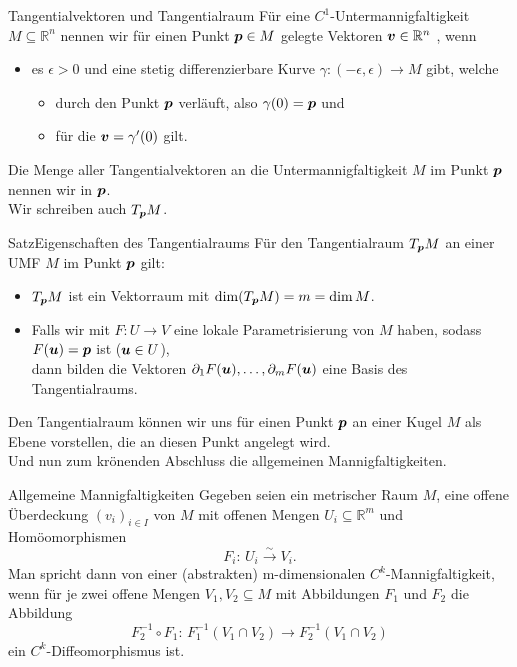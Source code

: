 \begin{Def}
{Tangentialvektoren und Tangentialraum}
Für eine $C^1$-Untermannigfaltigkeit $M\subseteq\mathbb{R}^n$ nennen wir für einen Punkt ${{\text{\boldmath${p}$}}}\in M$ gelegte Vektoren ${{\text{\boldmath${v}$}}}\in\mathbb{R}^n$ , wenn
\begin{itemize}
    \item es $\epsilon>0$ und eine stetig differenzierbare Kurve $\gamma:(-\epsilon,\epsilon)\to M$ gibt, welche
    \begin{itemize}
        \item durch den Punkt ${{\text{\boldmath${p}$}}}$ verläuft, also $\gamma(0)={{\text{\boldmath${p}$}}}$ und
        \item für die ${{\text{\boldmath${v}$}}}=\gamma'(0)$ gilt.
    \end{itemize}
\end{itemize}
Die Menge aller Tangentialvektoren an die Untermannigfaltigkeit $M$ im Punkt ${{\text{\boldmath${p}$}}}$ nennen wir  in ${{\text{\boldmath${p}$}}}$.\\
Wir schreiben auch $T_{{\text{\boldmath${p}$}}} M$.
\end{Def}
\begin{Satz}
{Satz}{Eigenschaften des Tangentialraums}
Für den Tangentialraum $T_{{\text{\boldmath${p}$}}} M$ an einer UMF $M$ im Punkt ${{\text{\boldmath${p}$}}}$ gilt:
\begin{itemize}
    \item $T_{{\text{\boldmath${p}$}}} M$ ist ein Vektorraum mit $\dim (T_{{\text{\boldmath${p}$}}} M)=m=\dim M$.
    \item Falls wir mit $F:U\to V$ eine lokale Parametrisierung von $M$ haben, sodass $F({{\text{\boldmath${u}$}}})={{\text{\boldmath${p}$}}}$ ist (${{\text{\boldmath${u}$}}}\in U$),\\
    dann bilden die Vektoren $\partial_1F({{\text{\boldmath${u}$}}}),\ldots,\partial_mF({{\text{\boldmath${u}$}}})$ eine Basis des Tangentialraums.
\end{itemize}
\end{Satz}
Den Tangentialraum können wir uns für einen Punkt ${{\text{\boldmath${p}$}}}$ an einer Kugel $M$ als Ebene vorstellen, die an diesen Punkt angelegt wird.\\

Und nun zum krönenden Abschluss die allgemeinen Mannigfaltigkeiten.
\begin{Def}
    {Allgemeine Mannigfaltigkeiten}
    Gegeben seien ein metrischer Raum $M$, eine offene Überdeckung $(v_i)_{i\in I}$ von $M$ mit offenen Mengen $U_i \subseteq \mathbb{R}^m$ und Homöomorphismen 
    \begin{equation*}
        F_i:\, U_i\overset{\sim}{\rightarrow} V_i.
    \end{equation*}
    Man spricht dann von einer (abstrakten) m-dimensionalen $C^k$-Mannigfaltigkeit, wenn für je zwei offene Mengen $V_1,V_2\subseteq M$ mit Abbildungen $F_1$ und $F_2$ die Abbildung
    \begin{equation*}
        F_2^{-1}\circ F_1:\, F_1^{-1}(V_1\cap V_2) \rightarrow F_2^{-1}(V_1\cap V_2)
    \end{equation*}
    ein $C^k$-Diffeomorphismus ist.
\end{Def}